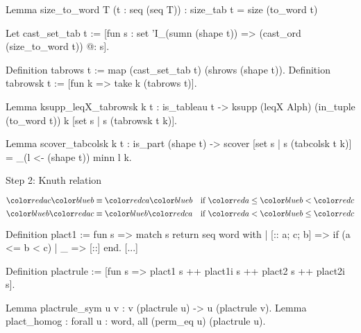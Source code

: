 \documentclass[compress,11pt]{beamer}
\begin{document}
\begin{frame}[fragile]

\begin{coqcode}
Lemma size_to_word T (t : seq (seq T)) : size_tab t = size (to_word t)

Let cast_set_tab t :=
  [fun s : {set 'I_(sumn (shape t))} => (cast_ord (size_to_word t)) @: s].

Definition tabrows t := map (cast_set_tab t) (shrows (shape t)).
Definition tabrowsk t := [fun k => take k (tabrows t)].

Lemma ksupp_leqX_tabrowsk k t : is_tableau t ->
  ksupp (leqX Alph) (in_tuple (to_word t)) k [set s | s \in (tabrowsk t k)].

Lemma scover_tabcolsk k t : is_part (shape t) ->
  scover [set s | s \in (tabcolsk t k)] = \sum_(l <- (shape t)) minn l k.
\end{coqcode}
\end{frame}

\begin{frame}[fragile]{Step 2: Knuth relation}

\[\red{ac}\blu{b} \equiv \red{ca}\blu{b} \quad \text{if $\red{a} \leq \blu{b} < \red{c}$}\]
\[\blu{b}\red{ac} \equiv \blu{b}\red{ca} \quad \text{if $\red{a} < \blu{b} \leq \red{c}$}\]

  \begin{coqcode}
Definition plact1 :=
  fun s => match s return seq word with
    | [:: a; c; b] => 
        if (a <= b < c)%
    | _ => [::]
  end.
[...]

Definition plactrule := 
  [fun s => plact1 s ++ plact1i s ++ plact2 s ++ plact2i s].

Lemma plactrule_sym u v : v \in (plactrule u) -> u \in (plactrule v).
Lemma plact_homog : forall u : word, all (perm_eq u) (plactrule u).
  \end{coqcode}
\end{frame}
\end{document}
